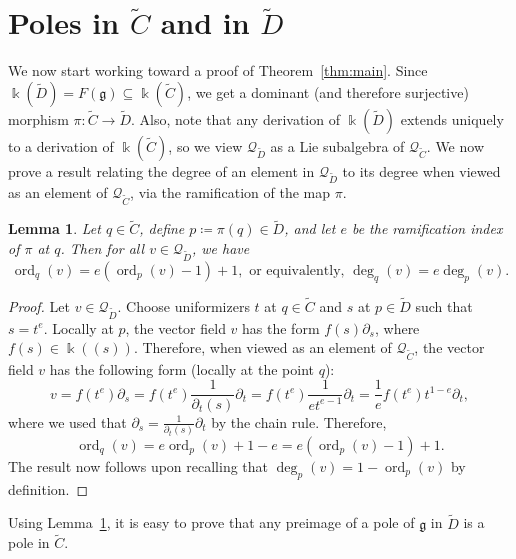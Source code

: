\documentclass[12pt]{amsart}
\theoremstyle{plain}
\newtheorem{lemma}[theorem]{Lemma}
\theoremstyle{definition}
\numberwithin{equation}{section}
\def\g{\mathfrak{g}}
\def\Q{\mathcal{Q}}
\def\kk{\Bbbk}
\DeclareMathOperator{\ord}{ord}
\def\del{\partial}
\begin{document}
\section{Poles in \texorpdfstring{$\widetilde{C}$}{C~} and in \texorpdfstring{$\widetilde{D}$}{D~}}\label{sec:relating poles in C and D}

We now start working toward a proof of Theorem~\ref{thm:main}. Since $\kk(\widetilde{D}) = F(\g) \subseteq \kk(\widetilde{C})$, we get a dominant (and therefore surjective) morphism $\pi \colon \widetilde{C} \to \widetilde{D}$. Also, note that any derivation of $\kk(\widetilde{D})$ extends uniquely to a derivation of $\kk(\widetilde{C})$, so we view $\Q_{\widetilde{D}}$ as a Lie subalgebra of $\Q_{\widetilde{C}}$. We now prove a result relating the degree of an element in $\Q_{\widetilde{D}}$ to its degree when viewed as an element of $\Q_{\widetilde{C}}$, via the ramification of the map $\pi$.

\begin{lemma}\label{lem:ramification}
    Let $q \in \widetilde{C}$, define $p \coloneqq \pi(q) \in \widetilde{D}$, and let $e$ be the ramification index of $\pi$ at $q$. Then for all $v \in \Q_{\widetilde{D}}$, we have
    $$\ord_q(v) = e(\ord_p(v) - 1) + 1, \text { or equivalently, } \deg_q(v) = e\deg_p(v).$$
\end{lemma}
\begin{proof}
    Let $v \in \Q_{\widetilde{D}}$. Choose uniformizers $t$ at $q \in \widetilde{C}$ and $s$ at $p \in \widetilde{D}$ such that $s = t^e$. Locally at $p$, the vector field $v$ has the form $f(s) \del_s$, where $f(s) \in \kk((s))$. Therefore, when viewed as an element of $\Q_{\widetilde{C}}$, the vector field $v$ has the following form (locally at the point $q$):
    $$v = f(t^e) \del_s = f(t^e) \frac{1}{\del_t(s)} \del_t = f(t^e) \frac{1}{e t^{e - 1}} \del_t = \frac{1}{e} f(t^e) t^{1 - e} \del_t,$$
    where we used that $\del_s = \frac{1}{\del_t(s)} \del_t$ by the chain rule. Therefore,
    $$\ord_q(v) = e \ord_p(v) + 1 - e = e(\ord_p(v) - 1) + 1.$$
    The result now follows upon recalling that $\deg_p(v) = 1 - \ord_p(v)$ by definition.
\end{proof}

Using Lemma~\ref{lem:ramification}, it is easy to prove that any preimage of a pole of $\g$ in $\widetilde{D}$ is a pole in $\widetilde{C}$.
\end{document}
